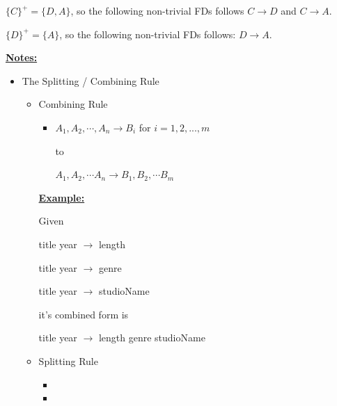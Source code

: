 \documentclass[12pt]{article}
\begin{document}
\begin{enumerate}[1.]
\begin{enumerate}[a)]
\begin{mdframed}
        \bigskip

        $\{C\}^+ = \{D,A\}$, so the following non-trivial FDs follows
        $C \to D$ and $C \to A$.

        \bigskip
        $\{D\}^+ = \{A\}$, so the following non-trivial FDs follows:
        $D \to A$.


        \end{mdframed}

        \bigskip

        \underline{\textbf{Notes:}}

        \bigskip

        \begin{itemize}
            \item The Splitting / Combining Rule
            \begin{itemize}
                \item Combining Rule
                \begin{itemize}
                    \item

                    $A_1,A_2,\cdots,A_n \to B_i$ for $i = 1,2,...,m$

                    to

                    $A_1,A_2,\cdots A_n \to B_1,B_2,\cdots B_m$
                \end{itemize}

                \bigskip

                \underline{\textbf{Example:}}

                \bigskip

                Given

                \bigskip

                title year $\to$ length

                title year $\to$ genre

                title year $\to$ studioName

                \bigskip

                it's combined form is

                \bigskip

                title year $\to$ length genre studioName

                \bigskip

                \item Splitting Rule
                \begin{itemize}
                    \item
                    \item


\end{itemize}
\end{itemize}
\end{itemize}
\end{enumerate}
\end{enumerate}
\end{document}
